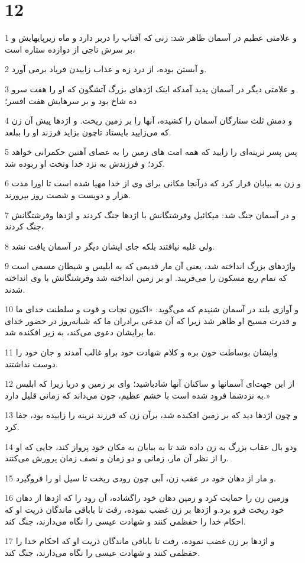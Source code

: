\chapter{12}

\par 1 و علامتی عظیم در آسمان ظاهر شد: زنی که آفتاب را دربر دارد و ماه زیرپایهایش و بر سرش تاجی از دوازده ستاره است،
\par 2 و آبستن بوده، از درد زه و عذاب زاییدن فریاد برمی آورد.
\par 3 و علامتی دیگر در آسمان پدید آمدکه اینک اژدهای بزرگ آتشگون که او را هفت سرو ده شاخ بود و بر سرهایش هفت افسر؛
\par 4 و دمش ثلث ستارگان آسمان را کشیده، آنها را بر زمین ریخت. و اژدها پیش آن زن که می‌زایید بایستاد تاچون بزاید فرزند او را ببلعد.
\par 5 پس پسر نرینه‌ای را زایید که همه امت های زمین را به عصای آهنین حکمرانی خواهد کرد؛ و فرزندش به نزد خدا وتخت او ربوده شد.
\par 6 و زن به بیابان فرار کرد که درآنجا مکانی برای وی از خدا مهیا شده است تا اورا مدت هزار و دویست و شصت روز بپرورند.
\par 7 و در آسمان جنگ شد: میکائیل وفرشتگانش با اژدها جنگ کردند و اژدها وفرشتگانش جنگ کردند،
\par 8 ولی غلبه نیافتند بلکه جای ایشان دیگر در آسمان یافت نشد.
\par 9 واژدهای بزرگ انداخته شد، یعنی آن مار قدیمی که به ابلیس و شیطان مسمی است که تمام ربع مسکون را می‌فریبد. او بر زمین انداخته شد وفرشتگانش با وی انداخته شدند.
\par 10 و آوازی بلند در آسمان شنیدم که می‌گوید: «اکنون نجات و قوت و سلطنت خدای ما و قدرت مسیح او ظاهر شد زیرا که آن مدعی برادران ما که شبانه‌روز در حضور خدای ما برایشان دعوی می‌کند، به زیر افکنده شد.
\par 11 وایشان بوساطت خون بره و کلام شهادت خود براو غالب آمدند و جان خود را دوست نداشتند.
\par 12 از این جهت‌ای آسمانها و ساکنان آنها شادباشید؛ وای بر زمین و دریا زیرا که ابلیس به نزدشما فرود شده است با خشم عظیم، چون می‌داند که زمانی قلیل دارد.»
\par 13 و چون اژدها دید که بر زمین افکنده شد، برآن زن که فرزند نرینه را زاییده بود، جفا کرد.
\par 14 ودو بال عقاب بزرگ به زن داده شد تا به بیابان به مکان خود پرواز کند، جایی که او را از نظر آن مار، زمانی و دو زمان و نصف زمان پرورش می‌کنند.
\par 15 و مار از دهان خود در عقب زن، آبی چون رودی ریخت تا سیل او را فرو‌گیرد.
\par 16 وزمین زن را حمایت کرد و زمین دهان خود راگشاده، آن رود را که اژدها از دهان خود ریخت فرو برد.و اژدها بر زن غضب نموده، رفت تا باباقی ماندگان ذریت او که احکام خدا را حفظمی کنند و شهادت عیسی را نگاه می‌دارند، جنگ کند.
\par 17 و اژدها بر زن غضب نموده، رفت تا باباقی ماندگان ذریت او که احکام خدا را حفظمی کنند و شهادت عیسی را نگاه می‌دارند، جنگ کند.

